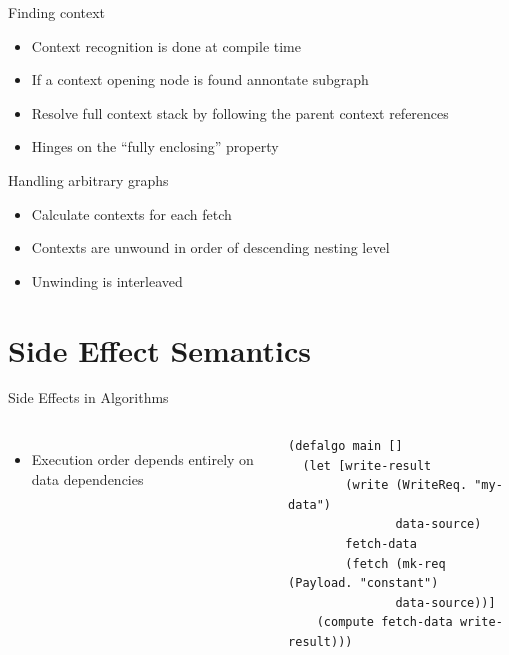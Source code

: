 \documentclass[utf8x,10pt,aspectratio=169]{beamer}
\begin{document}
\begin{frame}{Finding context}
	
	\begin{itemize}
		\item Context recognition is done at compile time
		\item If a context opening node is found annontate subgraph
		\item Resolve full context stack by following the parent context references
		\item Hinges on the ``fully enclosing'' property
	\end{itemize}
	
\end{frame}

\begin{frame}{Handling arbitrary graphs}
	
	\begin{itemize}
		\item Calculate contexts for each fetch
		\item Contexts are unwound in order of descending nesting level
		\item Unwinding is interleaved
	\end{itemize}
\end{frame}
\section{Side Effect Semantics}
\begin{frame}[fragile]{Side Effects in Algorithms}
	\begin{columns}
		\begin{itemize}
			\item Execution order depends entirely on data dependencies
		\end{itemize}
		\begin{verbatim}
(defalgo main []
  (let [write-result 
        (write (WriteReq. "my-data") 
               data-source)
        fetch-data 
        (fetch (mk-req (Payload. "constant") 
               data-source))]
    (compute fetch-data write-result)))
		\end{verbatim}
		
	\end{columns}
\end{frame}
\end{document}
